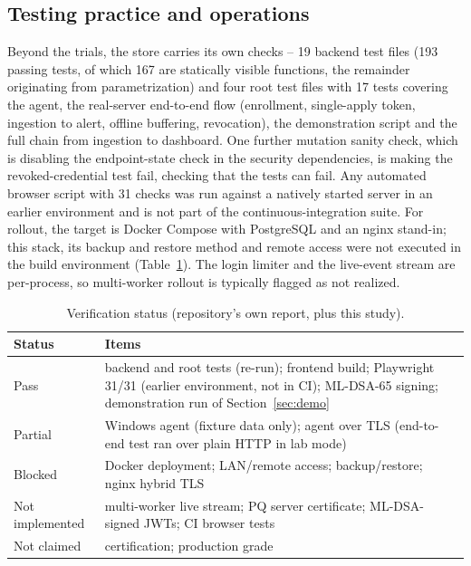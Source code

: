 \documentclass[conference]{IEEEtran}
\begin{document}
\subsection{Testing practice and operations}
Beyond the trials, the store carries its own checks -- 19 backend test files (193 passing tests, of which 167 are statically visible functions, the remainder originating from parametrization) and four root test files with 17 tests covering the agent, the real-server end-to-end flow (enrollment, single-apply token, ingestion to alert, offline buffering, revocation), the demonstration script and the full chain from ingestion to dashboard. One further mutation sanity check, which is disabling the endpoint-state check in the security dependencies, is making the revoked-credential test fail, checking that the tests can fail. Any automated browser script with 31 checks was run against a natively started server in an earlier environment and is not part of the continuous-integration suite. For rollout, the target is Docker Compose with PostgreSQL and an nginx stand-in; this stack, its backup and restore method and remote access were not executed in the build environment (Table~\ref{tab:status}). The login limiter and the live-event stream are per-process, so multi-worker rollout is typically flagged as not realized.

\begin{table}[t]
\caption{Verification status (repository's own report, plus this study).}
\label{tab:status}
\centering
\footnotesize
\begin{tabular}{@{}l p{5.6cm}@{}}
\toprule
Status & Items \\
\midrule
Pass & backend and root tests (re-run); frontend build; Playwright 31/31 (earlier environment, not in CI); ML-DSA-65 signing; demonstration run of Section~\ref{sec:demo} \\
Partial & Windows agent (fixture data only); agent over TLS (end-to-end test ran over plain HTTP in lab mode) \\
Blocked & Docker deployment; LAN/remote access; backup/restore; nginx hybrid TLS \\
Not implemented & multi-worker live stream; PQ server certificate; ML-DSA-signed JWTs; CI browser tests \\
Not claimed & certification; production grade \\
\bottomrule
\end{tabular}
\end{table}

\end{document}
